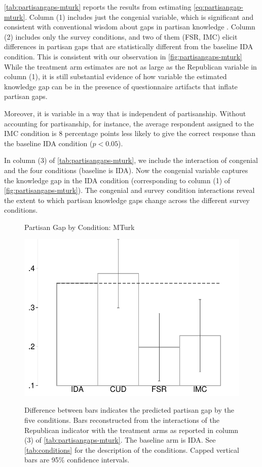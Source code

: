 \documentclass[12pt, letterpaper]{article}
\begin{document}
	
	\cref{tab:partisangaps-mturk} reports the results from estimating \cref{eq:partisangap-mturk}. Column (1) includes just the congenial variable, which is significant and consistent with conventional wisdom about gaps in partisan knowledge \citep[e.g.][]{bullocketal_2015, pew2018disagree}.
	Column (2) includes only the survey conditions, and two of them (FSR, IMC) elicit differences in partisan gaps that are statistically different from the baseline IDA condition. This is consistent with our observation in \cref{fig:partisangaps-mturk} While the treatment arm estimates are not as large as the Republican variable in column (1), it is still substantial evidence of how variable the estimated knowledge gap can be in the presence of questionnaire artifacts that inflate partisan gaps.
	
	Moreover, it is variable in a way that is independent of partisanship. Without accounting for partisanship, for instance, the average respondent assigned to the IMC condition is 8 percentage points less likely to give the correct response than the baseline IDA condition ($p<0.05$).
	
	In column (3) of \cref{tab:partisangaps-mturk}, we include the interaction of congenial and the four conditions (baseline is IDA). Now the congenial variable captures the knowledge gap in the IDA condition (corresponding to column (1) of \cref{fig:partisangaps-mturk}). The congenial and survey condition interactions reveal the extent to which partisan knowledge gaps change across the different survey conditions. 
	
	\begin{figure}[t]
		\centering
		\caption{Partisan Gap by Condition: MTurk}
		\includegraphics[width=.55\textwidth]{../figs/mturk-pgag-surveyarms.pdf}
		\label{fig:partisangaps-mturk-reg}
		\caption*{\footnotesize
			Difference between bars indicates the predicted partisan gap by the five conditions.
			Bars reconstructed from the interactions of the Republican indicator with the treatment arms as reported in column (3) of \cref{tab:partisangaps-mturk}.
			The baseline arm is IDA.
			See \cref{tab:conditions} for the description of the conditions.
			Capped vertical bars are 95\% confidence intervals.
		}
	\end{figure}
	
\end{document}
